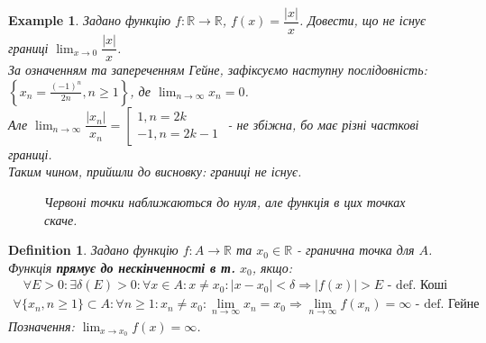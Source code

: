 \documentclass[a4paper, 14pt]{article}
\theoremstyle{theoremdd}
\theoremstyle{theoremdd}
\newtheorem{definition}[theorem]{Definition}
\theoremstyle{theoremdd}
\theoremstyle{theoremdd}
\newtheorem{example}[theorem]{Example}
\theoremstyle{theoremdd}
\theoremstyle{theoremdd}
\theoremstyle{theoremdd}
\theoremstyle{theoremdd}
\begin{document}
	\begin{example}
	Задано функцію $f: \mathbb{R} \to \mathbb{R}$, $f(x) = \dfrac{|x|}{x}$. Довести, що не існує границі $\displaystyle \lim_{x \to 0} \dfrac{|x|}{x}$.\\
	За означенням та запереченням Гейне, зафіксуємо наступну послідовність:\\
	$\displaystyle \left\{x_n = \frac{(-1)^n}{2n}, n \geq 1\right\}$, де $\displaystyle \lim_{n \to \infty} x_n = 0$.\\
	Але $\displaystyle \lim_{n \to \infty} \dfrac{|x_n|}{x_n} = \left[ \begin{gathered} 1, n = 2k \\ -1, n = 2k-1 \end{gathered} \right.$ - не збіжна, бо має різні часткові границі.\\
	Таким чином, прийшли до висновку: границі не існує.
	\begin{figure} [H]
	\centering
	\caption*{Червоні точки наближаються до нуля, але функція в цих точках скаче.}
	\end{figure}
	\end{example}
	
		\begin{definition}
	Задано функцію $f: A \to \mathbb{R}$ та $x_0 \in \mathbb{R}$ - гранична точка для $A$.\\
	Функція \textbf{прямує до нескінченності в т.} $x_0$, якщо:
	\begin{align*}
	\forall E > 0: \exists \delta(E) > 0: \forall x \in A: x \neq x_0: |x-x_0|<\delta \Rightarrow |f(x)|>E \textrm{ - def. Коші}
	\end{align*}
	\begin{align*}
	\forall \{x_n, n \geq 1\}\subset A: \forall n \geq 1: x_n \neq x_0: \lim_{n \to \infty} x_n = x_0 \Rightarrow \lim_{n \to \infty} f(x_n) = \infty \textrm{ - def. Гейне}
	\end{align*}
	Позначення: $\displaystyle \lim_{x \to x_0} f(x) = \infty$.
	\end{definition}
	
\end{document}
